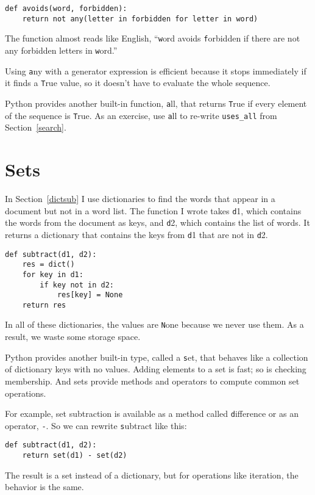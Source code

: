 \documentclass[
DIV=11,
fontsize=13,
twoside,
headinclude=false,
titlepage=firstiscover,
abstract=true,
headsepline=true,
footsepline=true,
chapterprefix=true, %
headings=big,
bibliography=totoc,%
captions=tableheading
]{scrbook}
\theoremstyle{definition}
\begin{document}
\begin{lstlisting}
def avoids(word, forbidden):
    return not any(letter in forbidden for letter in word)
\end{lstlisting}
%
The function almost reads like English, ``{\texttt word} avoids
{\texttt forbidden} if there are not any forbidden letters in {\texttt word}.''

Using {\texttt any} with a generator expression is efficient because
it stops immediately if it finds a {\texttt True} value,
so it doesn't have to evaluate the whole sequence.

Python provides another built-in function, {\texttt all}, that returns
{\texttt True} if every element of the sequence is {\texttt True}.  As
an exercise, use {\texttt all} to re-write \verb"uses_all" from
Section~\ref{search}.


\section{Sets}
\label{sets}

In Section~\ref{dictsub} I use dictionaries to find the words
that appear in a document but not in a word list.  The function
I wrote takes {\texttt d1}, which contains the words from the document
as keys, and {\texttt d2}, which contains the list of words.  It
returns a dictionary that contains the keys from {\texttt d1} that
are not in {\texttt d2}.

\begin{lstlisting}
def subtract(d1, d2):
    res = dict()
    for key in d1:
        if key not in d2:
            res[key] = None
    return res
\end{lstlisting}
%
In all of these dictionaries, the values are {\texttt None} because
we never use them.  As a result, we waste some storage space.

Python provides another built-in type, called a {\texttt set}, that
behaves like a collection of dictionary keys with no values.  Adding
elements to a set is fast; so is checking membership.  And sets
provide methods and operators to compute common set operations.

For example, set subtraction is available as a method called
{\texttt difference} or as an operator, {\texttt -}.  So we can rewrite
{\texttt subtract} like this:

\begin{lstlisting}
def subtract(d1, d2):
    return set(d1) - set(d2)
\end{lstlisting}
%
The result is a set instead of a dictionary, but for operations like
iteration, the behavior is the same.
\end{document}
